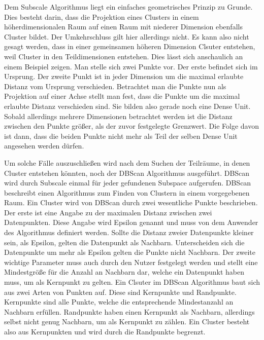 \documentclass[utf8,biblatex]{lni}
\begin{document}
Dem Subscale Algorithmus liegt ein einfaches geometrisches Prinzip zu Grunde. 
Dies besteht darin, dass die Projektion eines Clusters in einem höherdimensionalen Raum auf einen Raum mit niederer Dimension ebenfalls Cluster bildet. 
Der Umkehrschluss gilt hier allerdings nicht. 
Es kann also nicht gesagt werden, dass in einer gemeinsamen höheren Dimension Clsuter entstehen, weil Cluster in den Teildimensionen entstehen. 
Dies lässt sich anschaulich an einem Beispiel zeigen.
Man stelle sich zwei Punkte vor. 
Der erste befindet sich im Ursprung. 
Der zweite Punkt ist in jeder Dimension um die maximal erlaubte Distanz vom Ursprung verschieden. 
Betrachtet man die Punkte nun als Projektion auf einer Achse stellt man fest, dass die Punkte um die maximal erlaubte Distanz verschieden sind. 
Sie bilden also gerade noch eine Dense Unit. 
Sobald allerdings mehrere Dimensionen betrachtet werden ist die Distanz zwischen den Punkte größer, als der zuvor festgelegte Grenzwert. 
Die Folge davon ist dann, dass die beiden Punkte nicht mehr als Teil der selben Dense Unit angesehen werden dürfen. 

Um solche Fälle auszuschließen wird nach dem Suchen der Teilräume, in denen Cluster entstehen könnten, noch der DBScan Algorithmus ausgeführt. 
DBScan wird durch Subscale einmal für jeder gefundenen Subspace aufgerufen. 
DBScan beschreibt einen Algorithmus zum Finden von Clustern in einem vorgegebenen Raum. 
Ein Cluster wird von DBScan durch zwei wesentliche Punkte beschrieben. 
Der erste ist eine Angabe zu der maximalen Distanz zwischen zwei Datenpunkten. 
Diese Angabe wird Epsilon genannt und muss von dem Anwender des Algorithmus definiert werden. 
Sollte die Distanz zweier Datenpunkte kleiner sein, als Epsilon, gelten die Datenpunkt als Nachbarn. 
Unterscheiden sich die Datenpunkte um mehr als Epsilon gelten die Punkte nicht Nachbarn. 
Der zweite wichtige Parameter muss auch durch den Nutzer festgelegt werden und stellt eine Mindestgröße für die Anzahl an Nachbarn dar, welche ein Datenpunkt haben muss, um als Kernpunkt zu gelten. 
Ein Clsuter im DBScan Algorithmus baut sich aus zwei Arten von Punkten auf. 
Diese sind Kernpunkte und Randpunkte. 
Kernpunkte sind alle Punkte, welche die entsprechende Mindestanzahl an Nachbarn erfüllen. 
Randpunkte haben einen Kernpunkt als Nachbarn, allerdings selbst nicht genug Nachbarn, um als Kernpunkt zu zählen. 
Ein Cluster besteht also aus Kernpunkten und wird durch die Randpunkte begrenzt. 
\end{document}
